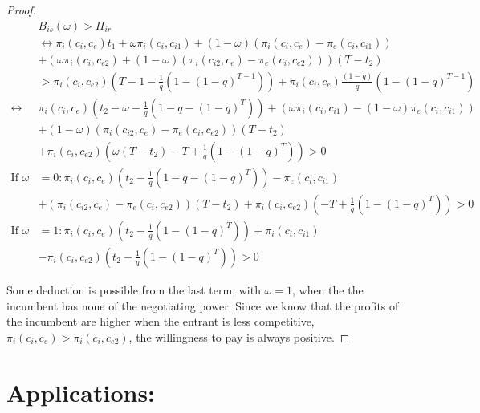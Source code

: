 \documentclass[12pt]{report}
\numberwithin{equation}{section}
\begin{document}
\begin{proof}
\begin{align*}
&B_{is}(\omega)>\Pi_{ir}
\\
& \leftrightarrow \pi_i(c_i,c_{e})t_1 
+\omega \pi_i(c_i,c_{i1})+(1-\omega)(\pi_i(c_i,c_{e})-\pi_e(c_i,c_{i1}))
\\&+(\omega \pi_i(c_i,c_{e2})+(1-\omega)(\pi_i(c_{i2},c_e)-\pi_e(c_{i},c_{e2})))(T-t_2)  \\
&> \pi_{i}(c_i,c_{e2}) \left( T-1 - \frac{1}{q} \left( 1-(1-q)^{T-1} \right) \right)
+\pi_i(c_i,c_e) \frac{(1-q)}{q} \left( 1-(1-q)^{T-1} \right) \\
\leftrightarrow &\pi_i(c_i,c_e)(t_2 -\omega-\frac{1}{q} \left( 1-q-(1-q)^{T} \right)) 
+(\omega \pi_i(c_i,c_{i1})-(1-\omega)\pi_e(c_i,c_{i1})) \\
& +(1-\omega)(\pi_i(c_{i2},c_e)-\pi_e(c_{i},c_{e2}))(T-t_2) \\
&+ \pi_i(c_{i},c_{e2})\left(\omega(T-t_2)-T+\frac{1}{q} \left( 1-(1-q)^{T} \right)\right)
> 0 \\
\text{If }\omega &=0: \pi_i(c_i,c_e)(t_2 -\frac{1}{q} \left( 1-q-(1-q)^{T} \right)) 
-\pi_e(c_i,c_{i1})  \\
&+(\pi_i(c_{i2},c_e)-\pi_e(c_{i},c_{e2}))(T-t_2)+ \pi_i(c_{i},c_{e2})\left(-T+\frac{1}{q} \left( 1-(1-q)^{T} \right)\right)
> 0
 \\
\text{If }\omega &=1: \pi_i(c_i,c_e)(t_2 -\frac{1}{q} \left( 1-(1-q)^{T} \right)) 
+\pi_i(c_i,c_{i1})\\
&- \pi_i(c_{i},c_{e2})\left(t_2 - \frac{1}{q} \left( 1-(1-q)^{T} \right)\right)
> 0
\end{align*}

Some deduction is possible from the last term, with $\omega = 1$, when the the incumbent has none of the negotiating power. Since we know that the profits of the incumbent are higher when the entrant is less competitive, $\pi_i(c_i,c_e)>\pi_i(c_{i},c_{e2})$, the willingness to pay is always positive. 
\end{proof}

\section{Applications:}\label{application}
\end{document}
